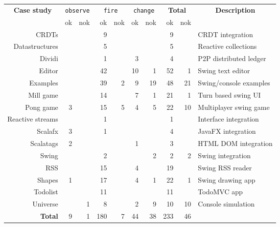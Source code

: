 
\begin{tabular}{r|rr|rr|rr|rr|l}

\multicolumn{1}{c|}{\multirow{2}{*}{\textbf{Case study}}} &\multicolumn{2}{c|}{\texttt{observe}} 	&	\multicolumn{2}{c|}{\texttt{fire}}	&	\multicolumn{2}{c|}{\texttt{change}}	&	\multicolumn{2}{c|}{\textbf{Total}}& \multicolumn{1}{c}{\multirow{2}{*}{\textbf{Description}}}\\
&	 ok&	 nok&	 ok&	 nok&	 ok&	 nok&	ok&	nok\\
\hline
CRDTs			&	&	&	9&	&	&	&	9&		&CRDT integration\\
Datastructures	&	&	&	5&	&	&	&	5&		&Reactive collections\\
Dividi			&	&	&	1&	&	3&	&	4&		&P2P distributed ledger\\
Editor			&	&	&	42&	&	10&	1&	52&	1	&Swing text editor\\
Examples		&	&	&	39&	2&	9&	19&	48&	21	&Swing/console examples\\
Mill game		&	&	&	14&	&	7&	1&	21&	1	&Turn based swing UI\\
Pong game		&	3&	&	15&	5&	4&	5&	22&	10	&Multiplayer swing game\\
Reactive streams&	&	&	1&	&	&	&	1&		&Interface integration\\
Scalafx			&	3&	&	1&	&	&	&	4&		&JavaFX integration\\
Scalatags		&	2&	&	&	&	1&	&	3&		&HTML DOM integration\\
Swing			&	&	&	2&	&	&	2&	2&	2	&Swing integration\\
RSS				&	&	&	15&	&	4&	&	19&		&Swing RSS reader\\
Shapes			&	1&	&	17&	&	4&	1&	22&	1	&Swing drawing app\\
Todolist		&	&	&	11&	&	&	&	11&		&TodoMVC app\\
Universe		&	&	1&	8&	&	2&	9&	10&	10	&Console simulation\\
\hline
\textbf{Total}&	9&	1&	180&	7&	44&	38&	233&	46

\end{tabular}

